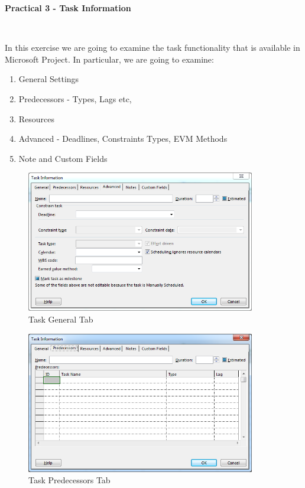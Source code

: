 
	

\begin{flushleft}
\Large\textbf{Practical 3 - Task Information}\
\end{flushleft}
\

In this exercise we are going to examine the task functionality that is available in Microsoft Project.  In particular, we are going to examine:

\begin{enumerate}
	\item General Settings
	\item Predecessors - Types, Lags etc,
	\item Resources
	\item Advanced - Deadlines, Constraints Types, EVM Methods
	\item Note and Custom Fields
\end{enumerate}

\begin{figure}
	\centering
		\includegraphics[width=10cm]{img/General.PNG}
	\caption{Task General Tab}
	\label{fig:General}
\end{figure}

\begin{figure}
	\centering
		\includegraphics[width=10cm]{img/Predecessors.PNG}
	\caption{Task Predecessors Tab}
	\label{fig:Predecessors}
\end{figure}

